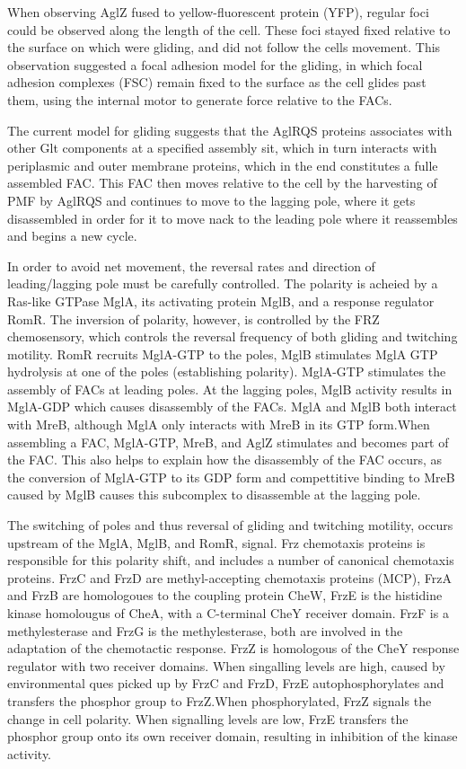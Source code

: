 \documentclass[fleqn,10pt]{wlscirep}
\begin{document}
When observing AglZ fused to yellow-fluorescent protein (YFP), regular foci could be observed along the length of the cell. These foci stayed fixed relative to the surface on which  were gliding, and did not follow the cells movement. This observation suggested a focal adhesion model for the gliding, in which focal adhesion complexes (FSC) remain fixed to the surface as the cell glides past them, using the internal motor to generate force relative to the FACs.

The current model for gliding suggests that the AglRQS proteins associates with other Glt components at a specified assembly sit, which in turn interacts with periplasmic and outer membrane proteins, which in the end constitutes a fulle assembled FAC. This FAC then moves relative to the cell by the harvesting of PMF by AglRQS and continues to move to the lagging pole, where it gets disassembled in order for it to move nack to the leading pole where it reassembles and begins a new cycle.


In order to avoid net movement, the reversal rates and direction of leading/lagging pole must be carefully controlled. The polarity is acheied by a Ras-like GTPase MglA, its activating protein MglB, and a response regulator RomR. The inversion of polarity, however, is controlled by the FRZ chemosensory, which controls the reversal frequency of both gliding and twitching motility. RomR recruits MglA-GTP to the poles, MglB stimulates MglA GTP hydrolysis at one of the poles (establishing polarity). MglA-GTP stimulates the assembly of FACs at leading poles. At the lagging poles, MglB activity results in MglA-GDP which causes disassembly of the FACs. MglA and MglB both interact with MreB, although MglA only interacts with MreB in its GTP form.When assembling a FAC, MglA-GTP, MreB, and AglZ stimulates and becomes part of the FAC. This also helps to explain how the disassembly of the FAC occurs, as the conversion of MglA-GTP to its GDP form and compettitive binding to MreB caused by MglB causes this subcomplex to disassemble at the lagging pole.

The switching of poles and thus reversal of gliding and twitching motility, occurs upstream of the MglA, MglB, and RomR, signal. Frz chemotaxis proteins is responsible for this polarity shift, and includes a number of canonical chemotaxis proteins. FrzC and FrzD are methyl-accepting chemotaxis proteins (MCP), FrzA and FrzB are homologoues to the coupling protein CheW, FrzE is the histidine kinase homolougus of CheA, with a C-terminal CheY receiver domain. FrzF is a methylesterase and FrzG is the methylesterase, both are involved in the adaptation of the chemotactic response. FrzZ is homologous of the CheY response regulator with two receiver domains. When singalling levels are high, caused by environmental ques picked up by FrzC and FrzD, FrzE autophosphorylates and transfers the phosphor group to FrzZ.When phosphorylated, FrzZ signals the change in cell polarity. When signalling levels are low, FrzE transfers the phosphor group onto its own receiver domain, resulting in inhibition of the kinase activity.    
\end{document}
